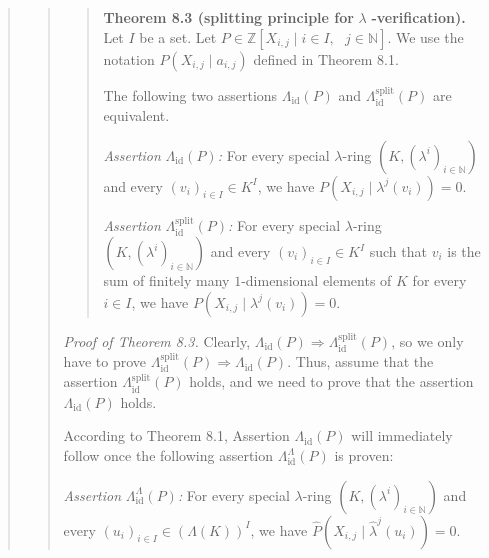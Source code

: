 \documentclass[12pt,final,notitlepage,onecolumn,german]{article}%
\begin{document}
\begin{quote}
\begin{quote}
\begin{quote}
\textbf{Theorem 8.3 (splitting principle for }$\lambda$%
\textbf{-verification).} Let $I$ be a set. Let $P\in\mathbb{Z}\left[
X_{i,j}\mid i\in I,\text{ }j\in\mathbb{N}\right]  $. We use the notation
$P\left(  X_{i,j}\mid a_{i,j}\right)  $ defined in Theorem 8.1.

The following two assertions $\Lambda_{\operatorname*{id}}\left(  P\right)  $
and $\Lambda_{\operatorname*{id}}^{\operatorname*{split}}\left(  P\right)  $
are equivalent.

\textit{Assertion }$\Lambda_{\operatorname*{id}}\left(  P\right)  $\textit{:}
For every special $\lambda$-ring $\left(  K,\left(  \lambda^{i}\right)
_{i\in\mathbb{N}}\right)  $ and every $\left(  v_{i}\right)  _{i\in I}\in
K^{I}$, we have $P\left(  X_{i,j}\mid\lambda^{j}\left(  v_{i}\right)  \right)
=0$.

\textit{Assertion }$\Lambda_{\operatorname*{id}}^{\operatorname*{split}%
}\left(  P\right)  $\textit{:} For every special $\lambda$-ring $\left(
K,\left(  \lambda^{i}\right)  _{i\in\mathbb{N}}\right)  $ and every $\left(
v_{i}\right)  _{i\in I}\in K^{I}$ such that $v_{i}$ is the sum of finitely
many $1$-dimensional elements of $K$ for every $i\in I$, we have $P\left(
X_{i,j}\mid\lambda^{j}\left(  v_{i}\right)  \right)  =0$.
\end{quote}

\textit{Proof of Theorem 8.3.} Clearly, $\Lambda_{\operatorname*{id}}\left(
P\right)  \Longrightarrow\Lambda_{\operatorname*{id}}^{\operatorname*{split}%
}\left(  P\right)  $, so we only have to prove $\Lambda_{\operatorname*{id}%
}^{\operatorname*{split}}\left(  P\right)  \Longrightarrow\Lambda
_{\operatorname*{id}}\left(  P\right)  $. Thus, assume that the assertion
$\Lambda_{\operatorname*{id}}^{\operatorname*{split}}\left(  P\right)  $
holds, and we need to prove that the assertion $\Lambda_{\operatorname*{id}%
}\left(  P\right)  $ holds.

According to Theorem 8.1, Assertion $\Lambda_{\operatorname*{id}}\left(
P\right)  $ will immediately follow once the following assertion
$\Lambda_{\operatorname*{id}}^{\Lambda}\left(  P\right)  $ is proven:

\textit{Assertion }$\Lambda_{\operatorname*{id}}^{\Lambda}\left(  P\right)
$\textit{:} For every special $\lambda$-ring $\left(  K,\left(  \lambda
^{i}\right)  _{i\in\mathbb{N}}\right)  $ and every $\left(  u_{i}\right)
_{i\in I}\in\left(  \Lambda\left(  K\right)  \right)  ^{I}$, we have
$\widehat{P}\left(  X_{i,j}\mid\widehat{\lambda}^{j}\left(  u_{i}\right)
\right)  =0$.


\end{quote}
\end{quote}
\end{document}

